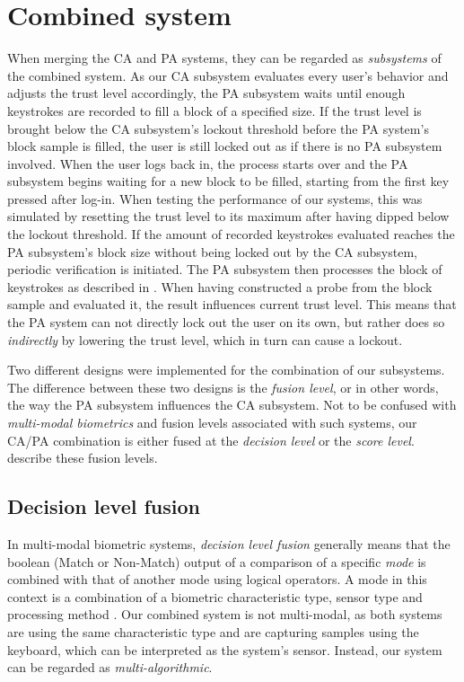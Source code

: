 \section{Combined system}
\label{sec:system-design-combined}
When merging the CA and PA systems, they can be regarded as \textit{subsystems} of the combined system.
As our CA subsystem evaluates every user's behavior and adjusts the trust level accordingly, the PA subsystem waits until enough keystrokes are recorded to fill a block of a specified size.
If the trust level is brought below the CA subsystem's lockout threshold before the PA system's block sample is filled, the user is still locked out as if there is no PA subsystem involved.
When the user logs back in, the process starts over and the PA subsystem begins waiting for a new block to be filled, starting from the first key pressed after log-in.
When testing the performance of our systems, this was simulated by resetting the trust level to its maximum after having dipped below the lockout threshold.
If the amount of recorded keystrokes evaluated reaches the PA subsystem's block size without being locked out by the CA subsystem, periodic verification is initiated.
The PA subsystem then processes the block of keystrokes as described in .
When having constructed a probe from the block sample and evaluated it, the result influences current trust level.
This means that the PA system can not directly lock out the user on its own, but rather does so \textit{indirectly} by lowering the trust level, which in turn can cause a lockout.

Two different designs were implemented for the combination of our subsystems.
The difference between these two designs is the \textit{fusion level}, or in other words, the way the PA subsystem influences the CA subsystem.
Not to be confused with \textit{multi-modal biometrics} and fusion levels associated with such systems, our CA/PA combination is either fused at the \textit{decision level} or the \textit{score level}.
 describe these fusion levels.

\subsection{Decision level fusion}
\label{sec:system-design-combined-decision}
In multi-modal biometric systems, \textit{decision level fusion} generally means that the boolean (Match or Non-Match) output of a comparison of a specific \textit{mode} is combined with that of another mode using logical operators.
A mode in this context is a combination of a biometric characteristic type, sensor type and processing method \cite{ISO-voc}.
Our combined system is not multi-modal, as both systems are using the same characteristic type and are capturing samples using the keyboard, which can be interpreted as the system's sensor.
Instead, our system can be regarded as \textit{multi-algorithmic}.

